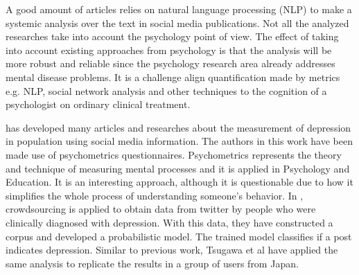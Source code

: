 \documentclass[11pt, notitlepage]{article} %
\begin{document}
A good amount of articles relies on natural language processing (NLP) to make a systemic analysis over the text in social media publications. 
Not all the analyzed researches take into account the psychology point of view. The effect of taking into account existing approaches from psychology is that the analysis will be more robust and reliable since the psychology research area already addresses mental disease problems. It is a challenge align quantification made by metrics e.g. NLP, social network analysis and other techniques to the cognition of a psychologist on ordinary clinical treatment. 

\cite{DeChoudhury:2013:SMM:2464464.2464480} has developed many articles and researches about the measurement of depression in population using social media information. The authors in this work have been made use of psychometrics questionnaires. 
Psychometrics represents the theory and technique of measuring mental processes and it is applied in Psychology and Education. It is an interesting approach, although it is questionable due to how it simplifies the whole process of understanding someone's behavior.
In \cite{DeChoudhury:2013:SMM:2464464.2464480}, crowdsourcing is applied to obtain data from twitter by people who were clinically diagnosed with depression. With this data, they have constructed a corpus and developed a probabilistic model. The trained model classifies if a post indicates depression.
Similar to previous work, Tsugawa et al \cite{Tsugawa2015} have applied the same analysis to replicate the results in a group of users from Japan.
\end{document}
